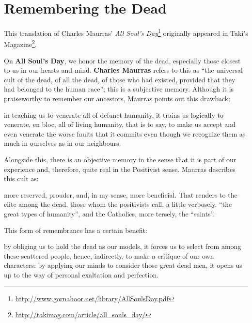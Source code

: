 \section{Remembering the Dead}

\begin{quotex}
This translation of Charles Maurras' \textit{All Soul's Day}\footnote{\url{http://www.gornahoor.net/library/AllSoulsDay.pdf}} originally appeared in Taki's Magazine\footnote{\url{http://takimag.com/article/all\_souls\_day/}}.
\end{quotex}

On \textbf{All Soul's Day}, we honor the memory of the dead, especially those closest to us in our hearts and mind. \textbf{Charles Maurras} refers to this as ``the universal cult of the dead, of all the dead, of those who had existed, provided that they had belonged to the human race''; this is a subjective memory. Although it is praiseworthy to remember our ancestors, Maurras points out this drawback:

\begin{quotex}
in teaching us to venerate all of defunct humanity, it trains us logically to venerate, en bloc, all of living humanity, that is to say, to make us accept and even venerate the worse faults that it commits even though we recognize them as much in ourselves as in our neighbours.
\end{quotex}


Alongside this, there is an objective memory in the sense that it is part of our experience and, therefore, quite real in the Positivist sense. Maurras describes this cult as:

\begin{quotex}
more reserved, prouder, and, in my sense, more beneficial. That renders to the elite among the dead, those whom the positivists call, a little verbosely, ``the great types of humanity'', and the Catholics, more tersely, the ``saints''.
\end{quotex}


This form of remembrance has a certain benefit:

\begin{quotex}
by obliging us to hold the dead as our models, it forces us to select from among these scattered people, hence, indirectly, to make a critique of our own characters: by applying our minds to consider those great dead men, it opens us up to the way of personal exaltation and perfection.
\end{quotex}


